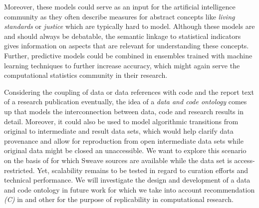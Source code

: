\documentclass{sig-alternate}
\begin{document}
Moreover, these models could serve as an input for the artificial intelligence community as they often describe measures for abstract concepts like \textit{living standards} or \textit{justice} which are typically hard to model.
Although these models are and should always be debatable, the semantic linkage to statistical indicators gives information on aspects that are relevant for understanding these concepts.
Further, predictive models could be combined in ensembles trained with machine learning techniques to further increase accuracy, which might again serve the computational statistics community in their research.


Considering the coupling of data or data references with code and the report text of a research publication eventually, the idea of a \textit{data and code ontology} comes up that models the interconnection between data, code and research results in detail. 
Moreover, it could also be used to model algorithmic transitions from original to intermediate and result data sets, which would help clarify data provenance and allow for reproduction from open intermediate data sets while original data might be closed an unaccessible.
We want to explore this scenario on the basis of \cite{arai2011fragile} for which Sweave sources are available while the data set is access-restricted.
Yet, scalability remains to be tested in regard to curation efforts and technical performance.
We will investigate the design and development of a data and code ontology in future work for which we take into account recommendation \textit{(C)} in \cite{RePEc_ejw_journl_v_4_y_2007_i_3_p_326_337} and other
%
%
\cite{KoenkerZeileis2009} 
%
\cite{baiocchi2007reproducible}
%
\cite{gentleman2007statistical}
%
\cite{rahmandad2012reporting}
for the purpose of replicability in computational research.


%
%
%
\end{document}
